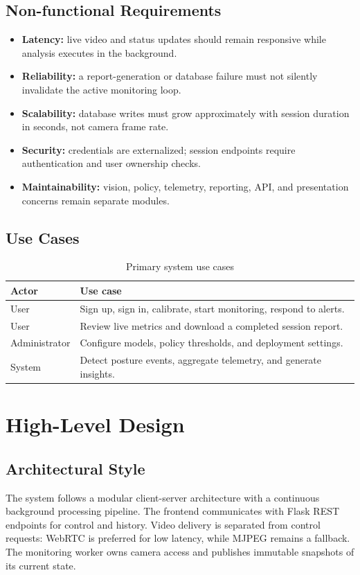 \documentclass[12pt,a4paper]{report}
\begin{document}
\section{Non-functional Requirements}
\begin{itemize}
    \item \textbf{Latency:} live video and status updates should remain
    responsive while analysis executes in the background.
    \item \textbf{Reliability:} a report-generation or database failure must
    not silently invalidate the active monitoring loop.
    \item \textbf{Scalability:} database writes must grow approximately with
    session duration in seconds, not camera frame rate.
    \item \textbf{Security:} credentials are externalized; session endpoints
    require authentication and user ownership checks.
    \item \textbf{Maintainability:} vision, policy, telemetry, reporting,
    API, and presentation concerns remain separate modules.
\end{itemize}

\section{Use Cases}
\begin{table}[H]
\centering
\caption{Primary system use cases}
\begin{tabular}{p{}p{}}
\toprule
\textbf{Actor} & \textbf{Use case}\\
\midrule
User & Sign up, sign in, calibrate, start monitoring, respond to alerts.\\
User & Review live metrics and download a completed session report.\\
Administrator & Configure models, policy thresholds, and deployment settings.\\
System & Detect posture events, aggregate telemetry, and generate insights.\\
\bottomrule
\end{tabular}
\end{table}

\chapter{High-Level Design}
\section{Architectural Style}
The system follows a modular client-server architecture with a continuous
background processing pipeline. The frontend communicates with Flask REST
endpoints for control and history. Video delivery is separated from control
requests: WebRTC is preferred for low latency, while MJPEG remains a fallback.
The monitoring worker owns camera access and publishes immutable snapshots of
its current state.
\end{document}
